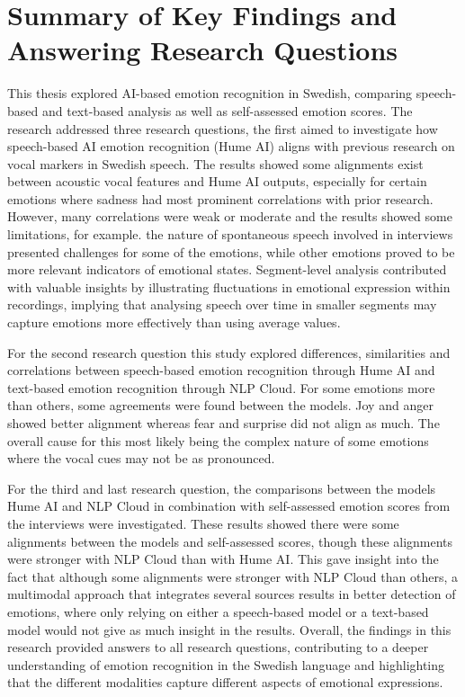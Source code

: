 \section{Summary of Key Findings and Answering Research Questions}
\label{sec:con-key-findings}
This thesis explored AI-based emotion recognition in Swedish, comparing speech-based and text-based analysis as well as self-assessed emotion scores. The research addressed three research questions, the first aimed to investigate how speech-based AI emotion recognition (Hume AI) aligns with previous research on vocal markers in Swedish speech. The results showed some alignments exist between acoustic vocal features and Hume AI outputs, especially for certain emotions where sadness had most prominent correlations with prior research. However, many correlations were weak or moderate and the results showed some limitations, for example. the nature of spontaneous speech involved in interviews presented challenges for some of the emotions, while other emotions proved to be more relevant indicators of emotional states. Segment-level analysis contributed with valuable insights by illustrating fluctuations in emotional expression within recordings, implying that analysing speech over time in smaller segments may capture emotions more effectively than using average values. 

For the second research question this study explored differences, similarities and correlations between speech-based emotion recognition through Hume AI and text-based emotion recognition through NLP Cloud.
For some emotions more than others, some agreements were found between the models. Joy and anger showed better alignment whereas fear and surprise did not align as much. The overall cause for this most likely being the complex nature of some emotions where the vocal cues may not be as pronounced. 

For the third and last research question, the comparisons between the models Hume AI and NLP Cloud in combination with self-assessed emotion scores from the interviews were investigated. These results showed there were some alignments between the models and self-assessed scores, though these alignments were stronger with NLP Cloud than with Hume AI. This gave insight into the fact that although some alignments were stronger with NLP Cloud than others, a multimodal approach that integrates several sources results in better detection of emotions, where only relying on either a speech-based model or a text-based model would not give as much insight in the results.
Overall, the findings in this research provided answers to all research questions, contributing to a deeper understanding of emotion recognition in the Swedish language and highlighting that the different modalities capture different aspects of emotional expressions.
